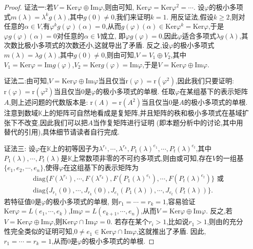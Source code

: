 \documentclass[../../main.tex]{subfiles}
\begin{document}
\begin{proof}
{\color{blue}证法一:}若$V=\mathrm{Ker}\varphi\oplus\mathrm{Im}\varphi$,则由可知, $\mathrm{Ker}\varphi=\mathrm{Ker}\varphi^2=\cdots$. 设$\varphi$的极小多项式$m(\lambda)=\lambda^kg(\lambda)$,其中$g(0)\neq 0$,我们来证明$k = 1$. 用反证法,假设$k\geqslant 2$,则对任意的$\alpha\in V$,有$\varphi^kg(\varphi)(\alpha)=0$,从而$g(\varphi)(\alpha)\in\mathrm{Ker}\varphi^k=\mathrm{Ker}\varphi$,于是$\varphi g(\varphi)(\alpha)=0$对任意的$\alpha\in V$成立, 即$\varphi g(\varphi)=0$,因此$\varphi$适合多项式$\lambda g(\lambda)$,其次数比极小多项式的次数还小,这就导出了矛盾. 反之,设$\varphi$的极小多项式$m(\lambda)=\lambda g(\lambda)$,其中$g(0)\neq 0$,则由可知,$V = V_1\oplus V_2$,其中$V_1=\mathrm{Ker}\varphi=\mathrm{Im}g(\varphi)$,$V_2=\mathrm{Ker}g(\varphi)=\mathrm{Im}\varphi$,于是$V=\mathrm{Ker}\varphi\oplus\mathrm{Im}\varphi$.

{\color{blue}证法二:}由可知,$V=\mathrm{Ker}\varphi\oplus\mathrm{Im}\varphi$当且仅当$\mathrm{r}(\varphi)=\mathrm{r}(\varphi^2)$,因此我们只要证明: $\mathrm{r}(\varphi)=\mathrm{r}(\varphi^2)$当且仅当$0$是$\varphi$的极小多项式的单根. 任取$\varphi$在某组基下的表示矩阵$A$,则上述问题的代数版本是: $\mathrm{r}(A)=\mathrm{r}(A^2)$当且仅当$0$是$A$的极小多项式的单根. 注意到数域$\mathbb{K}$上的矩阵可自然地看成是复矩阵,并且矩阵的秩和极小多项式在基域扩张下不改变,因此我们可以把$A$当作复矩阵进行证明 (即本题分析中的讨论,其中用替代的引用),具体细节请读者自行完成.

{\color{blue}证法三:}
设$\varphi$在$\mathbb{K}$上的初等因子为$\lambda^{r_1},\cdots,\lambda^{r_k},P_1(\lambda)^{e_1},\cdots,P_t(\lambda)^{e_t}$,其中$P_1(\lambda),\cdots,P_t(\lambda)$是$\mathbb{K}$上常数项非零的不可约多项式,则由或可知,存在$V$的一组基$\{e_1,e_2,\cdots,e_n\}$,使得$\varphi$在这组基下的表示矩阵为
\begin{align*}
&\mathrm{diag}\{F(\lambda^{r_1}),\cdots,F(\lambda^{r_k}),F(P_1(\lambda)^{e_1}),\cdots,F(P_t(\lambda)^{e_t})\}\text{ 或 }\\
&\mathrm{diag}\{J_{r_1}(0),\cdots,J_{r_k}(0),J_{e_1}(P_1(\lambda)),\cdots,J_{e_t}(P_t(\lambda))\}.
\end{align*}
若特征值$0$是$\varphi$的极小多项式的单根, 则$r_1 = \cdots = r_k = 1$,容易验证$\mathrm{Ker}\varphi = L(e_1,\cdots,e_k)$,$\mathrm{Im}\varphi = L(e_{k + 1},\cdots,e_n)$,从而$V = \mathrm{Ker}\varphi\oplus\mathrm{Im}\varphi$. 反之,若$V = \mathrm{Ker}\varphi\oplus\mathrm{Im}\varphi$,则$\mathrm{Ker}\varphi\cap\mathrm{Im}\varphi = 0$. 若存在某个$r_i > 1$,比如说$r_1 > 1$,则由的充分性完全类似的证明可知,$0\neq e_1\in\mathrm{Ker}\varphi\cap\mathrm{Im}\varphi$,这就推出了矛盾. 因此,$r_1 = \cdots = r_k = 1$,从而$0$是$\varphi$的极小多项式的单根. 

\end{proof}
\end{document}
